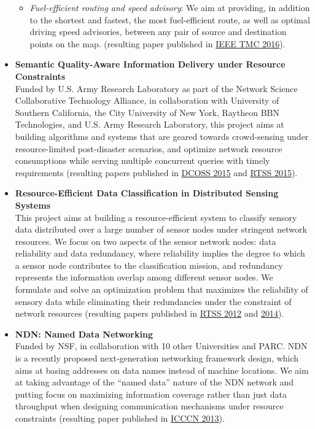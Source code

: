 \begin{itemize}
\begin{itemize}
\item {\em Fuel-efficient routing and speed advisory}: We aim at providing, in addition to the shortest and fastest, the most fuel-efficient route, as well as optimal driving speed advisories, between any pair of source and destination points on the map. (resulting paper published in \hyperlink{saremi2016tmc}{\textsc{IEEE TMC 2016}}).
\end{itemize}

\item \textbf{Semantic Quality-Aware Information Delivery under Resource Constraints}\\ Funded by U.S. Army Research Laboratory as part of the Network Science Collaborative Technology Alliance, in collaboration with University of Southern California, the City University of New York, Raytheon BBN Technologies, and U.S. Army Research Laboratory, this project aims at building algorithms and systems that are geared towards crowd-sensing under resource-limited post-disaster scenarios, and optimize network resource consumptions while serving multiple concurrent queries with timely requirements (resulting papers published in \hyperlink{hu2015dcoss}{\textsc{DCOSS 2015}} and \hyperlink{hu2015rtss}{\textsc{RTSS 2015}}).

\item \textbf{Resource-Efficient Data Classification in Distributed Sensing Systems} \\
This project aims at building a resource-efficient system to classify sensory data distributed over a large number of sensor nodes under stringent network resources. We focus on two aspects of the sensor network nodes: data reliability and data redundancy, where reliability implies the degree to which a sensor node contributes to the classification mission, and redundancy represents the information overlap among different sensor nodes. We formulate and solve an optimization problem that maximizes the reliability of sensory data while eliminating their redundancies under the constraint of network resources (resulting papers published in \hyperlink{su2012rtss}{\textsc{RTSS 2012}} and \hyperlink{su2014rtss}{\textsc{2014}}).

\item \textbf{NDN: Named Data Networking} \\
Funded by NSF, in collaboration with 10 other Universities and PARC. NDN is a recently proposed next-generation networking framework design, which aims at basing addresses on data names instead of machine locations. We aim at taking advantage of the ``named data'' nature of the NDN network and putting focus on maximizing information coverage rather than just data throughput when designing communication mechanisms under resource constraints (resulting paper published in \hyperlink{wang2013icccn}{\textsc{ICCCN 2013}}).

\end{itemize}

